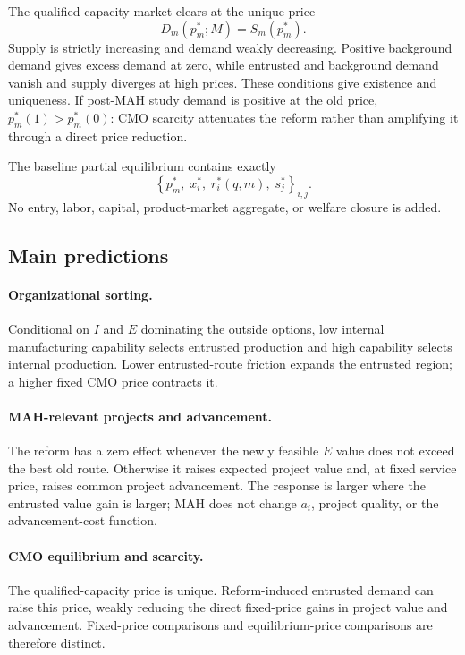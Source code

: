 \documentclass[11pt]{article}
\begin{document}
The qualified-capacity market clears at the unique price
\begin{equation}
  D_m(p_m^*;M)=S_m(p_m^*).
  \label{eq:p16m-clearing}
\end{equation}
Supply is strictly increasing and demand weakly decreasing. Positive
background demand gives excess demand at zero, while entrusted and
background demand vanish and supply diverges at high prices. These conditions
give existence and uniqueness. If post-MAH study demand is positive at the
old price, \(p_m^*(1)>p_m^*(0)\): CMO scarcity attenuates the reform rather
than amplifying it through a direct price reduction.

The baseline partial equilibrium contains exactly
\begin{equation}
  \left\{
  p_m^*,\;
  x_i^*,\;
  r_i^*(q,m),\;
  s_j^*
  \right\}_{i,j}.
  \label{eq:p16m-equilibrium}
\end{equation}
No entry, labor, capital, product-market aggregate, or welfare closure is
added.

\subsection{Main predictions}
\label{subsec:p16m-predictions}

\paragraph{Organizational sorting.}
Conditional on \(I\) and \(E\) dominating the outside options, low internal
manufacturing capability selects entrusted production and high capability
selects internal production. Lower entrusted-route friction expands the
entrusted region; a higher fixed CMO price contracts it.

\paragraph{MAH-relevant projects and advancement.}
The reform has a zero effect whenever the newly feasible \(E\) value does not
exceed the best old route. Otherwise it raises expected project value and,
at fixed service price, raises common project advancement. The response is
larger where the entrusted value gain is larger; MAH does not change
\(a_i\), project quality, or the advancement-cost function.

\paragraph{CMO equilibrium and scarcity.}
The qualified-capacity price is unique. Reform-induced entrusted demand can
raise this price, weakly reducing the direct fixed-price gains in project
value and advancement. Fixed-price comparisons and equilibrium-price
comparisons are therefore distinct.
\end{document}
